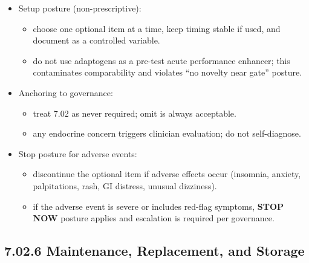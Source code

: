\documentclass[10pt]{article}
\begin{document}
\begin{itemize}
\item Setup posture (non-prescriptive):
  \begin{itemize}
  \item choose one optional item at a time, keep timing stable if used, and document as a controlled variable.
  \item do not use adaptogens as a pre-test acute performance enhancer; this contaminates comparability and violates “no novelty near gate” posture.
  \end{itemize}
\item Anchoring to governance:
  \begin{itemize}
  \item treat 7.02 as never required; omit is always acceptable.
  \item any endocrine concern triggers clinician evaluation; do not self-diagnose.
  \end{itemize}
\item Stop posture for adverse events:
  \begin{itemize}
  \item discontinue the optional item if adverse effects occur (insomnia, anxiety, palpitations, rash, GI distress, unusual dizziness).
  \item if the adverse event is severe or includes red-flag symptoms, \textbf{STOP} \textbf{NOW} posture applies and escalation is required per governance.
  \end{itemize}
\end{itemize}

\subsection*{7.02.6 Maintenance, Replacement, and Storage}
{}
\end{document}
